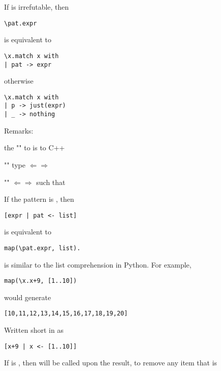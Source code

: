 \documentclass[svgnames,fleqn]{beamer}
\begin{document}
\begin{frame}[fragile]

\bi
\item If  is irrefutable, then
\begin{lstlisting}
\pat.expr
\end{lstlisting}
is equivalent to
\begin{lstlisting}
\x.match x with 
| pat -> expr
\end{lstlisting}
otherwise
\begin{lstlisting}
\x.match x with 
| p -> just(expr)
| _ -> nothing
\end{lstlisting}

\item Remarks:
\bi
\item the "" to  is   to C++
\item "" type $\Leftarrow\Rightarrow$ 
\item "" $\Leftarrow\Rightarrow$  such that  
\ei
\ei
\end{frame}

\begin{frame}[fragile]
\bi
\item If the pattern  is , then
\begin{lstlisting}
[expr | pat <- list]
\end{lstlisting}
is equivalent to
\begin{lstlisting}
map(\pat.expr, list).
\end{lstlisting}

\item {} is similar to the list comprehension in Python. For example,
\begin{lstlisting}
map(\x.x+9, [1..10])
\end{lstlisting}
would generate
\begin{lstlisting}
[10,11,12,13,14,15,16,17,18,19,20]
\end{lstlisting}
\item Written short in  as
\begin{lstlisting}
[x+9 | x <- [1..10]]
\end{lstlisting}
\item If  is , then  will be called upon the result, to remove any item that is 
\ei

\end{frame}
\end{document}
